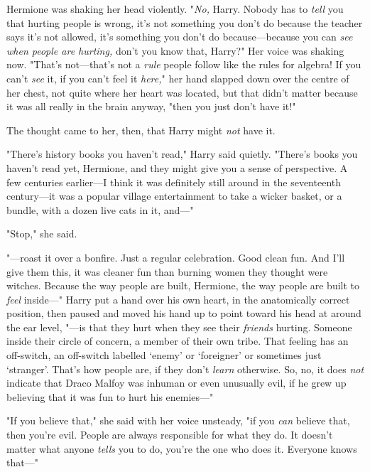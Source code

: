 Hermione was shaking her head violently. "\emph{No,} Harry. Nobody has to
\emph{tell} you that hurting people is wrong, it’s not something you don’t do
because the teacher says it’s not allowed, it’s something you don’t do
because—because you can \emph{see when people are hurting,} don’t you know
that, Harry?" Her voice was shaking now. "That’s not—that’s not a \emph{rule}
people follow like the rules for algebra! If you can’t \emph{see} it, if you
can’t feel it \emph{here,}" her hand slapped down over the centre of her chest,
not quite where her heart was located, but that didn’t matter because it was
all really in the brain anyway, "then you just don’t have it!"

The thought came to her, then, that Harry might \emph{not} have it.

"There’s history books you haven’t read," Harry said quietly. "There’s books
you haven’t read yet, Hermione, and they might give you a sense of perspective.
A few centuries earlier—I think it was definitely still around in the
seventeenth century—it was a popular village entertainment to take a wicker
basket, or a bundle, with a dozen live cats in it, and—"

"Stop," she said.

"—roast it over a bonfire. Just a regular celebration. Good clean fun. And
I’ll give them this, it was cleaner fun than burning women they thought were
witches. Because the way people are built, Hermione, the way people are built
to \emph{feel} inside—" Harry put a hand over his own heart, in the
anatomically correct position, then paused and moved his hand up to point
toward his head at around the ear level, "—is that they hurt when they see
their \emph{friends} hurting. Someone inside their circle of concern, a member
of their own tribe. That feeling has an off-switch, an off-switch labelled
‘enemy’ or ‘foreigner’ or sometimes just ‘stranger’. That’s how people are, if
they don’t \emph{learn} otherwise. So, no, it does \emph{not} indicate that
Draco Malfoy was inhuman or even unusually evil, if he grew up believing that
it was fun to hurt his enemies—"

"If you believe that," she said with her voice unsteady, "if you
\emph{can} believe that, then you’re evil. People are always responsible for
what they do. It doesn’t matter what anyone \emph{tells} you to do, you’re the
one who does it. Everyone knows that—"

